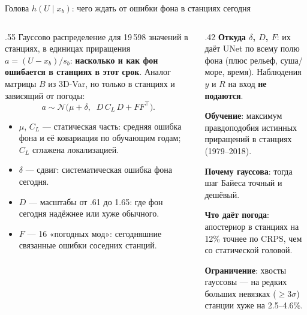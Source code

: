 \documentclass[10pt,aspectratio=169]{beamer}
\begin{document}
\begin{frame}{Голова $h(U\mid x_b)$: чего ждать от ошибки фона в станциях сегодня}
\begin{columns}[T]
\begin{column}{.55\textwidth}
\small
Гауссово распределение для 19\,598 значений в станциях, в единицах приращения $a=(U-x_b)/s_b$: \textbf{насколько и как фон ошибается в станциях в этот срок}. Аналог матрицы $B$ из 3D-Var, но только в станциях и зависящий от погоды:
\[
a\sim\mathcal N\big(\mu+\delta,\;\; D\,C_L\,D+F F^\top\big).
\]
\footnotesize
\begin{itemize}
\item $\mu$, $C_L$ --- статическая часть: средняя ошибка фона и её ковариация по обучающим годам; $C_L$ сглажена локализацией.
\item $\delta$ --- сдвиг: систематическая ошибка фона сегодня.
\item $D$ --- масштабы от .61 до 1.65: где фон сегодня надёжнее или хуже обычного.
\item $F$ --- 16 «погодных мод»: сегодняшние связанные ошибки соседних станций.
\end{itemize}
\end{column}
\begin{column}{.42\textwidth}
\small
\textbf{Откуда $\delta$, $D$, $F$}: их даёт UNet по всему полю фона (плюс рельеф, суша/море, время). Наблюдения $y$ и $R$ на вход \textbf{не подаются}.

\textbf{Обучение}: максимум правдоподобия истинных приращений в станциях (1979--2018).

\textbf{Почему гауссова}: тогда шаг Байеса точный и дешёвый.

\textbf{Что даёт погода}: апостериор в станциях на 12\% точнее по CRPS, чем со статической головой.

{\color{ink}\textbf{Ограничение}: хвосты гауссовы --- на редких больших невязках ($\ge3\sigma$) станции хуже на 2.5--4.6\%.}
\end{column}
\end{columns}
\end{frame}
\end{document}
